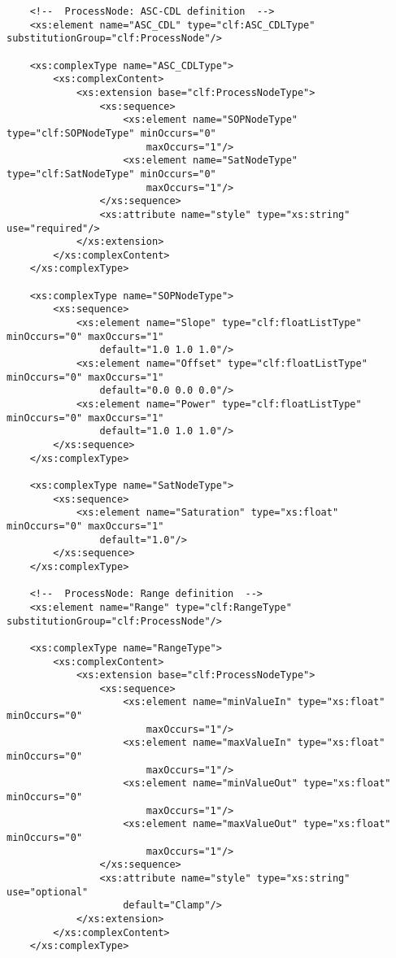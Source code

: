 \begin{lstlisting}
    <!--  ProcessNode: ASC-CDL definition  -->
    <xs:element name="ASC_CDL" type="clf:ASC_CDLType" substitutionGroup="clf:ProcessNode"/>
    
    <xs:complexType name="ASC_CDLType">
        <xs:complexContent>
            <xs:extension base="clf:ProcessNodeType">
                <xs:sequence>
                    <xs:element name="SOPNodeType" type="clf:SOPNodeType" minOccurs="0" 
                        maxOccurs="1"/>
                    <xs:element name="SatNodeType" type="clf:SatNodeType" minOccurs="0" 
                        maxOccurs="1"/>
                </xs:sequence>                
                <xs:attribute name="style" type="xs:string" use="required"/>
            </xs:extension>
        </xs:complexContent>        
    </xs:complexType>
    
    <xs:complexType name="SOPNodeType">
        <xs:sequence>
            <xs:element name="Slope" type="clf:floatListType" minOccurs="0" maxOccurs="1" 
                default="1.0 1.0 1.0"/>
            <xs:element name="Offset" type="clf:floatListType" minOccurs="0" maxOccurs="1" 
                default="0.0 0.0 0.0"/>
            <xs:element name="Power" type="clf:floatListType" minOccurs="0" maxOccurs="1" 
                default="1.0 1.0 1.0"/>
        </xs:sequence>
    </xs:complexType>

    <xs:complexType name="SatNodeType">
        <xs:sequence>
            <xs:element name="Saturation" type="xs:float" minOccurs="0" maxOccurs="1" 
                default="1.0"/>
        </xs:sequence>
    </xs:complexType>
    
    <!--  ProcessNode: Range definition  -->
    <xs:element name="Range" type="clf:RangeType" substitutionGroup="clf:ProcessNode"/>
    
    <xs:complexType name="RangeType">
        <xs:complexContent>
            <xs:extension base="clf:ProcessNodeType">
                <xs:sequence>
                    <xs:element name="minValueIn" type="xs:float" minOccurs="0" 
                        maxOccurs="1"/>
                    <xs:element name="maxValueIn" type="xs:float" minOccurs="0" 
                        maxOccurs="1"/>
                    <xs:element name="minValueOut" type="xs:float" minOccurs="0"
                        maxOccurs="1"/>
                    <xs:element name="maxValueOut" type="xs:float" minOccurs="0"
                        maxOccurs="1"/>
                </xs:sequence>
                <xs:attribute name="style" type="xs:string" use="optional" 
                    default="Clamp"/>
            </xs:extension>
        </xs:complexContent>
    </xs:complexType>
    

\end{lstlisting}

